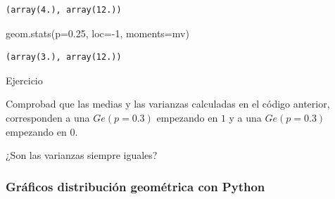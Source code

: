 \documentclass[
  letterpaper,
  DIV=11,
  numbers=noendperiod]{scrreprt}
\newenvironment{Shaded}{\begin{snugshade}}{\end{snugshade}}
\newcommand{\DecValTok}[1]{\textcolor[rgb]{0.68,0.00,0.00}{#1}}
\newcommand{\FloatTok}[1]{\textcolor[rgb]{0.68,0.00,0.00}{#1}}
\newcommand{\NormalTok}[1]{\textcolor[rgb]{0.00,0.23,0.31}{#1}}
\newcommand{\OperatorTok}[1]{\textcolor[rgb]{0.37,0.37,0.37}{#1}}
\newcommand{\StringTok}[1]{\textcolor[rgb]{0.13,0.47,0.30}{#1}}
\begin{document}
\begin{verbatim}
(array(4.), array(12.))
\end{verbatim}

\begin{Shaded}
\begin{Highlighting}[]
\NormalTok{geom.stats(p}\OperatorTok{=}\FloatTok{0.25}\NormalTok{, loc}\OperatorTok{={-}}\DecValTok{1}\NormalTok{, moments}\OperatorTok{=}\StringTok{\textquotesingle{}mv\textquotesingle{}}\NormalTok{)}
\end{Highlighting}
\end{Shaded}

\begin{verbatim}
(array(3.), array(12.))
\end{verbatim}

\begin{Ejercicio}{Ejercicio}{}

Comprobad que las medias y las varianzas calculadas en el código
anterior, corresponden a una \(Ge(p=0.3)\) empezando en \(1\) y a una
\(Ge(p=0.3)\) empezando en \(0\).

¿Son las varianzas siempre iguales?

\end{Ejercicio}

\subsubsection{Gráficos distribución geométrica con
Python}\label{gruxe1ficos-distribuciuxf3n-geomuxe9trica-con-python}
\end{document}
